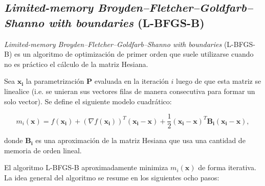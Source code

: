 \subsection{\emph{Limited-memory Broyden–Fletcher–Goldfarb–Shanno with boundaries} (L-BFGS-B)}\label{sec:lbfgsb}

\emph{Limited-memory Broyden–Fletcher–Goldfarb–Shanno with boundaries} (L-BFGS-B) es un algoritmo
de optimización de primer orden que suele utilizarse cuando no es práctico el cálculo de la matriz
Hesiana.

Sea $\boldsymbol{x_i}$ la parametrización $\boldsymbol{P}$ evaluada en la iteración $i$ 
luego de que esta matriz se linealice (i.e. se unieran sus vectores filas de manera consecutiva para 
formar un solo vector). Se define el siguiente modelo cuadrático:

\begin{equation}
m_i(\boldsymbol{x}) = f(\boldsymbol{x_i}) + (\nabla f(\boldsymbol{x_i}))^{T}(\boldsymbol{x_i}
- \boldsymbol{x}) + \frac{1}{2} (\boldsymbol{x_i}
- \boldsymbol{x})^{T} \boldsymbol{B_i} (\boldsymbol{x_i} - \boldsymbol{x}),
\end{equation}

\noindent donde $\boldsymbol{B_i}$ es una aproximación de la matriz Hesiana que usa una cantidad de memoria de orden
lineal.

El algoritmo L-BFGS-B aproximadamente minimiza $m_i(\boldsymbol{x})$ de forma iterativa.
La idea general del algoritmo se resume en los siguientes ocho pasos:

